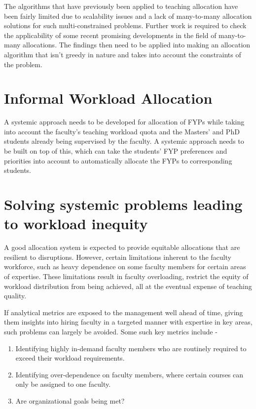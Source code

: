The algorithms that have previously been applied to teaching allocation have been fairly limited due to scalability issues and a lack of many-to-many allocation solutions for such multi-constrained problems. Further work is required to check the applicability of some recent promising developments in the field of many-to-many allocations. The findings then need to be applied into making an allocation algorithm that isn't greedy in nature and takes into account the constraints of the problem.

\section{Informal Workload Allocation}

A systemic approach needs to be developed for allocation of FYPs while taking into account the faculty's teaching workload quota and the Masters' and PhD students already being supervised by the faculty. A systemic approach needs to be built on top of this, which can take the students' FYP preferences and priorities into account to automatically allocate the FYPs to corresponding students.

\section{Solving systemic problems leading to workload inequity}

A good allocation system is expected to provide equitable allocations that are resilient to disruptions. However, certain limitations inherent to the faculty workforce, such as heavy dependence on some faculty members for certain areas of expertise. These limitations result in faculty overloading, restrict the equity of workload distribution from being achieved, all at the eventual expense of teaching quality. 

If analytical metrics are exposed to the management well ahead of time, giving them insights into hiring faculty in a targeted manner with expertise in key areas, such problems can largely be avoided. Some such key metrics include -
\begin{enumerate}
\item Identifying highly in-demand faculty members who are routinely required to exceed their workload requirements.
\item Identifying over-dependence on faculty members, where certain courses can only be assigned to one faculty.
\item Are organizational goals being met?
\end{enumerate}

